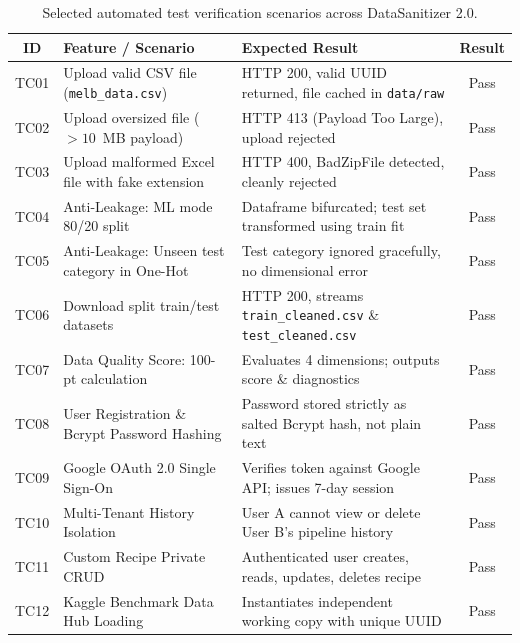 \begin{table}[ht]
\centering\small
\renewcommand{\arraystretch}{1.2}
\begin{tabular}{@{}clp{6.4cm}c@{}}
\toprule
\textbf{ID} & \textbf{Feature / Scenario} & \textbf{Expected Result} & \textbf{Result}\\
\midrule
TC01 & Upload valid CSV file (\texttt{melb\_data.csv}) & HTTP 200, valid UUID returned, file cached in \texttt{data/raw} & Pass\\
TC02 & Upload oversized file ($>10$~MB payload) & HTTP 413 (Payload Too Large), upload rejected & Pass\\
TC03 & Upload malformed Excel file with fake extension & HTTP 400, BadZipFile detected, cleanly rejected & Pass\\
TC04 & Anti-Leakage: ML mode 80/20 split & Dataframe bifurcated; test set transformed using train fit & Pass\\
TC05 & Anti-Leakage: Unseen test category in One-Hot & Test category ignored gracefully, no dimensional error & Pass\\
TC06 & Download split train/test datasets & HTTP 200, streams \texttt{train\_cleaned.csv} \& \texttt{test\_cleaned.csv} & Pass\\
TC07 & Data Quality Score: 100-pt calculation & Evaluates 4 dimensions; outputs score \& diagnostics & Pass\\
TC08 & User Registration \& Bcrypt Password Hashing & Password stored strictly as salted Bcrypt hash, not plain text & Pass\\
TC09 & Google OAuth 2.0 Single Sign-On & Verifies token against Google API; issues 7-day session & Pass\\
TC10 & Multi-Tenant History Isolation & User A cannot view or delete User B's pipeline history & Pass\\
TC11 & Custom Recipe Private CRUD & Authenticated user creates, reads, updates, deletes recipe & Pass\\
TC12 & Kaggle Benchmark Data Hub Loading & Instantiates independent working copy with unique UUID & Pass\\
\bottomrule
\end{tabular}
\caption{Selected automated test verification scenarios across DataSanitizer 2.0.}
\label{tab:test}
\end{table}

